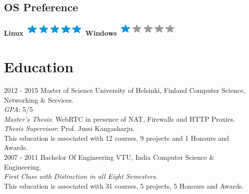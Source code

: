 \documentclass[]{friggeri-cv}
\begin{document}
\begin{aside}
  \section{OS Preference}
    \textbf{Linux}\includegraphics[scale=0.40]{img/5stars.png}
    \textbf{Windows}\includegraphics[scale=0.40]{img/1stars.png}
    ~
\end{aside}

\section{Education}
\begin{entrylist}
  \entry
    {2012 - 2015}
    {Master of Science}
    {\Large{University of Helsinki, Finland}}
    {Computer Science, Networking \& Services.\\
     \emph{GPA}: 5/5 \\
     \emph{Master's Thesis}: WebRTC in presence of NAT, Firewalls and HTTP Proxies.\\
     \emph{Thesis Supervisor}: Prof. Jussi Kangasharju.\\
     This education is associated with 12 courses, 9 projects and 1 Honours and Awards.\\}
  \entry
    {2007 - 2011}
    {Bachelor Of Engineering}
    {\Large{VTU, India}}
    {Computer Science \& Engineering.\\
    \emph{First Class with Distinction in all Eight Semesters.}\\
    This education is associated with 31 courses, 5 projects, 5 Honours and Awards.\\}
\end{entrylist}
\end{document}
